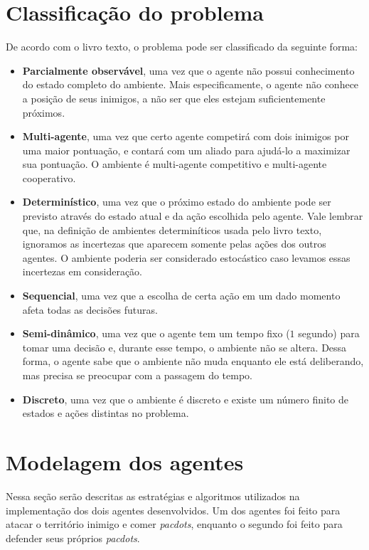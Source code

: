 \documentclass[a4paper,12pt]{article}
\begin{document}
\section{Classificação do problema}
De acordo com o livro texto, o problema pode ser classificado da seguinte forma:

\begin{itemize}
  \item \textbf{Parcialmente observável}, uma vez que o agente não possui conhecimento
  do estado completo do ambiente. Mais especificamente, o agente não conhece a posição
  de seus inimigos, a não ser que eles estejam suficientemente próximos.
  \item \textbf{Multi-agente}, uma vez que certo agente competirá com dois inimigos
  por uma maior pontuação, e contará com um aliado para ajudá-lo a maximizar sua
  pontuação. O ambiente é multi-agente competitivo e multi-agente cooperativo.
  \item \textbf{Determinístico}, uma vez que o próximo estado do ambiente pode ser
  previsto através do estado atual e da ação escolhida pelo agente. Vale lembrar que,
  na definição de ambientes determiníticos usada pelo livro texto, ignoramos as
  incertezas que aparecem somente pelas ações dos outros agentes. O ambiente poderia
  ser considerado estocástico caso levamos essas incertezas em consideração.
  \item \textbf{Sequencial}, uma vez que a escolha de certa ação em um dado momento
  afeta todas as decisões futuras.
  \item \textbf{Semi-dinâmico}, uma vez que o agente tem um tempo fixo ($1$ segundo)
  para tomar uma decisão e, durante esse tempo, o ambiente não se altera. Dessa forma,
  o agente sabe que o ambiente não muda enquanto ele está deliberando, mas precisa se
  preocupar com a passagem do tempo.
  \item \textbf{Discreto}, uma vez que o ambiente é discreto e existe um número
  finito de estados e ações distintas no problema.
\end{itemize}

\section{Modelagem dos agentes}
Nessa seção serão descritas as estratégias e algoritmos utilizados na implementação dos
dois agentes desenvolvidos. Um dos agentes foi feito para atacar o território inimigo
e comer \textit{pacdots}, enquanto o segundo foi feito para defender seus próprios
\textit{pacdots}.
\end{document}
